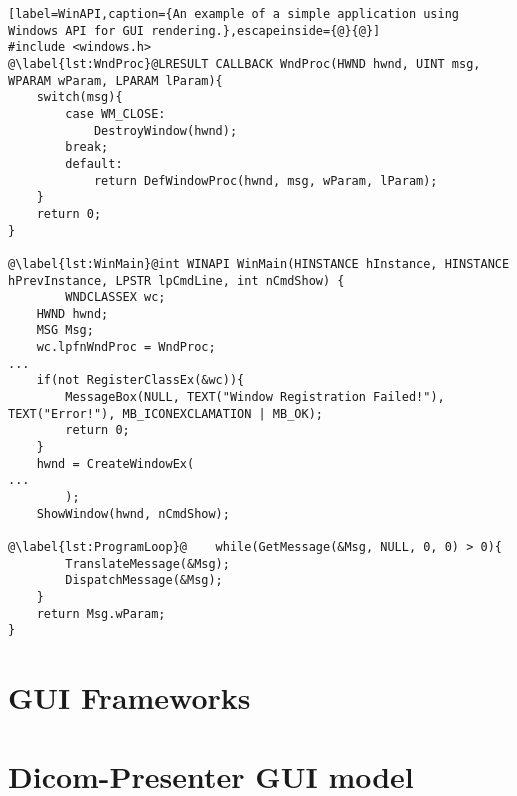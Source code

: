 \begin{lstlisting}[label=WinAPI,caption={An example of a simple application using Windows API for GUI rendering.},escapeinside={@}{@}]
#include <windows.h>
@\label{lst:WndProc}@LRESULT CALLBACK WndProc(HWND hwnd, UINT msg, WPARAM wParam, LPARAM lParam){
    switch(msg){
        case WM_CLOSE:
            DestroyWindow(hwnd);
        break;
        default:
            return DefWindowProc(hwnd, msg, wParam, lParam);
    }
    return 0;
}

@\label{lst:WinMain}@int WINAPI WinMain(HINSTANCE hInstance, HINSTANCE hPrevInstance, LPSTR lpCmdLine, int nCmdShow) {
		WNDCLASSEX wc;
    HWND hwnd;
    MSG Msg;
    wc.lpfnWndProc = WndProc;    
...
    if(not RegisterClassEx(&wc)){
        MessageBox(NULL, TEXT("Window Registration Failed!"), TEXT("Error!"), MB_ICONEXCLAMATION | MB_OK);
        return 0;
    }
    hwnd = CreateWindowEx(
...
		);
    ShowWindow(hwnd, nCmdShow);

@\label{lst:ProgramLoop}@    while(GetMessage(&Msg, NULL, 0, 0) > 0){
        TranslateMessage(&Msg);
        DispatchMessage(&Msg);
    }
    return Msg.wParam;
}
\end{lstlisting}

\section*{GUI Frameworks}




\section*{Dicom-Presenter GUI model}

